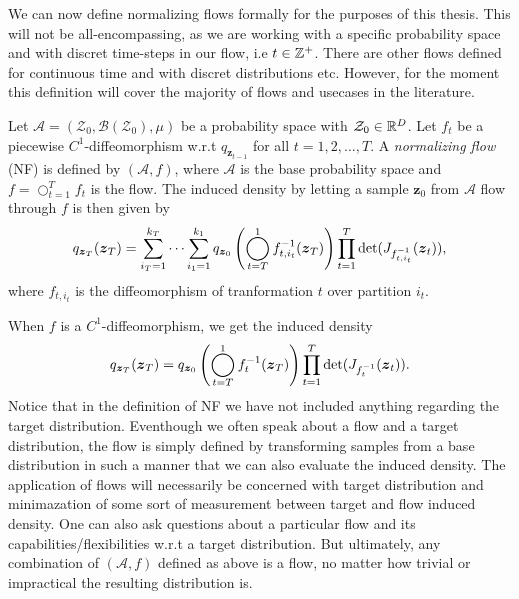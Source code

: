 We can now define normalizing flows formally for the purposes of this thesis. This will not be all-encompassing, as we 
are working with a specific probability space and with discret time-steps in our flow, i.e \(t \in \mathbb{Z}^{+}\). There are other 
flows defined for continuous time and with discret distributions etc. 
However, for the moment this definition will cover the majority of flows and usecases in the literature. 
\begin{definition}
    Let \(\mathcal{A} = (\mathcal{Z}_0, \mathscr{B}(\mathcal{Z}_0), \mu)\) be a probability space with 
    \(\mathcal{Z}_0 \in \mathbb{R}^D\). Let \(f_t\) be a piecewise \(C^1\)-diffeomorphism w.r.t 
    \(q_{\bm z_{t-1}}\) for all \(t = 1,2,\dots,T\). A \emph{normalizing flow} (NF) is defined by \((\mathcal{A}, f)\), where 
    \(\mathcal{A}\) is the base probability space and \(f = \bigcirc_{t=1}^T f_t\)
    is the flow. The induced density by letting a sample \(\bm z_0\) from \(\mathcal{A}\) flow
    through \(f\) is then given by 
    \begin{align}
        q_{\bm z_T}(\bm z_T) = \sum_{i_{T} = 1}^{k_{T}} \cdots \sum_{i_1 = 1}^{k_1} q_{\bm z_0}\left(
        \bigcircop_{t=T}^{1} f_{t,i_t}^{-1}(\bm z_T)\right) \prod_{t=1}^{T} \text{det}(J_{f_{t,i_t}^{-1}}(\bm z_t)),
    \end{align}
    where \(f_{t,i_t}\) is the diffeomorphism of tranformation \(t\) over partition \(i_t\).
\end{definition}
When \(f\) is a \(C^1\)-diffeomorphism, we get the induced density
\begin{align*}
    q_{\bm z_T}(\bm z_T) =  q_{\bm z_0}\left(
    \bigcircop_{t=T}^{1} f_{t}^{-1}(\bm z_T)\right) \prod_{t=1}^{T} \text{det}(J_{f_{t}^{-1}}(\bm z_t)).
\end{align*}
Notice that in the definition of NF we have not included anything regarding the target distribution. Eventhough we 
often speak about a flow and a target distribution, the flow is simply defined by transforming samples from a base distribution
in such a manner that we can also evaluate the induced density. The application of flows will necessarily be concerned with
target distribution and minimazation of some sort of measurement between target and flow induced density. One can also ask 
questions about a particular flow and its capabilities/flexibilities w.r.t a target distribution. But ultimately, any 
combination of \((\mathcal{A}, f)\) defined as above is a flow, no matter how trivial or impractical the resulting 
distribution is.

